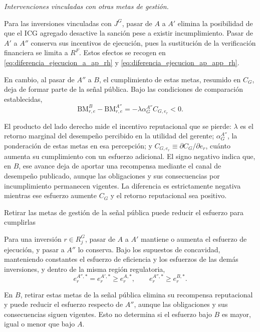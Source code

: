 \medskip
\noindent\textbullet\enspace\textit{Intervenciones vinculadas con otras metas de gestión.}
\par\smallskip

Para las inversiones vinculadas con \(J^{G}\), pasar de \(A\) a \(A'\) elimina la posibilidad de que el ICG agregado desactive la sanción pese a existir incumplimiento. Pasar de \(A'\) a \(A''\) conserva sus incentivos de ejecución, pues la sustitución de la verificación financiera se limita a \(R^{F}\). Estos efectos se recogen en \eqref{eq:diferencia_ejecucion_a_ap_rh} y \eqref{eq:diferencia_ejecucion_ap_app_rh}.

En cambio, al pasar de \(A''\) a \(B\), el cumplimiento de estas metas, resumido en \(C_G\), deja de formar parte de la señal pública. Bajo las condiciones de comparación establecidas,
\begin{equation}
\label{eq:diferencia_ejecucion_app_b_rg}
\mathrm{BM}_{r,e}^{B}
-
\mathrm{BM}_{r,e}^{A''}
=
-
\lambda
\alpha_G^{A''}
C_{G,e_r}
<0.
\end{equation}

El producto del lado derecho mide el incentivo reputacional que se pierde: \(\lambda\) es el retorno marginal del desempeño percibido en la utilidad del gerente; \(\alpha_G^{A''}\), la ponderación de estas metas en esa percepción; y \(C_{G,e_r}\equiv\partial C_G/\partial e_r\), cuánto aumenta su cumplimiento con un esfuerzo adicional. El signo negativo indica que, en \(B\), ese avance deja de aportar una recompensa mediante el canal de desempeño publicado, aunque las obligaciones y sus consecuencias por incumplimiento permanecen vigentes. La diferencia es estrictamente negativa mientras ese esfuerzo aumente \(C_G\) y el retorno reputacional sea positivo.

\begin{resultadobox}
{Retirar las metas de gestión de la señal pública puede reducir el esfuerzo para cumplirlas}
\label{res:incentivo_ejecucion_rg}

Para una inversión \(r\in R_j^{G}\), pasar de \(A\) a \(A'\) mantiene o aumenta el esfuerzo de ejecución, y pasar a \(A''\) lo conserva. Bajo los supuestos de concavidad, manteniendo constantes el esfuerzo de eficiencia y los esfuerzos de las demás inversiones, y dentro de la misma región regulatoria,
\begin{equation}
e_r^{A'',*}
=
e_r^{A',*}
\geq
e_r^{A,*},
\qquad
e_r^{A'',*}
\geq
e_r^{B,*}.
\end{equation}

En \(B\), retirar estas metas de la señal pública elimina su recompensa reputacional y puede reducir el esfuerzo respecto de \(A''\), aunque las obligaciones y sus consecuencias siguen vigentes. Esto no determina si el esfuerzo bajo \(B\) es mayor, igual o menor que bajo \(A\).
\end{resultadobox}

